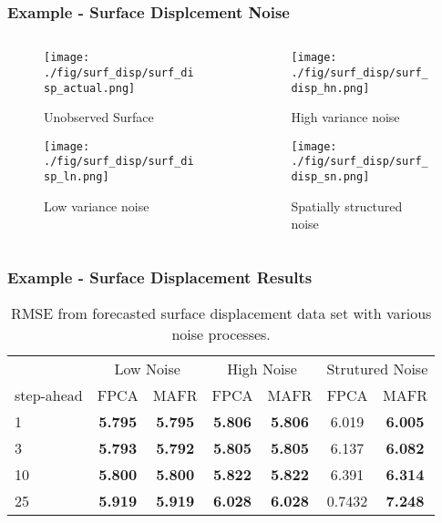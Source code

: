 \documentclass[aspectratio=169]{beamer}
\begin{document}
  \begin{frame}
    \frametitle{Example - Surface Displcement Noise}
    \begin{columns}[t]
      \begin{column}{.5\textwidth}
      \begin{figure}
        \texttt{[image: ./fig/surf\_disp/surf\_disp\_actual.png]}
      \caption{Unobserved Surface}
      \end{figure}%
      \begin{figure}
      \texttt{[image: ./fig/surf\_disp/surf\_disp\_ln.png]}
      \caption{Low variance noise}
      \end{figure}
      \end{column}
      \begin{column}{.5\textwidth}
      \begin{figure}
      \texttt{[image: ./fig/surf\_disp/surf\_disp\_hn.png]}
      \caption{High variance noise}
      \end{figure}%
      \begin{figure}
      \texttt{[image: ./fig/surf\_disp/surf\_disp\_sn.png]}
      \caption{Spatially structured noise}
      \end{figure}
      \end{column}
    \end{columns}
  \end{frame}
  
  \begin{frame}
    \frametitle{Example - Surface Displacement Results}
    \begin{table}[h]
        \setlength{\arrayrulewidth}{1.5px}
        \setlength{\tabcolsep}{10pt}
        \centering
        \begin{tabular}{lcccccc} \toprule
            & \multicolumn{2}{c}{Low Noise} & \multicolumn{2}{c}{High Noise} & \multicolumn{2}{c}{Strutured Noise} \\
            step-ahead & FPCA & MAFR & FPCA & MAFR & FPCA & MAFR \\ \bottomrule
            1 & \textbf{5.795} & \textbf{5.795} & \textbf{5.806} & \textbf{5.806} & 6.019 & \textbf{6.005} \\
            3 & \textbf{5.793} & \textbf{5.792} & \textbf{5.805} & \textbf{5.805} & 6.137 & \textbf{6.082} \\
            10 & \textbf{5.800} & \textbf{5.800} & \textbf{5.822} & \textbf{5.822} & 6.391 & \textbf{6.314} \\
            25 & \textbf{5.919} & \textbf{5.919} & \textbf{6.028} & \textbf{6.028} & 0.7432 & \textbf{7.248} \\
            \bottomrule
        \end{tabular}
        \caption{RMSE from forecasted surface displacement data set with various noise processes.}
    \end{table}
  \end{frame}
\end{document}
